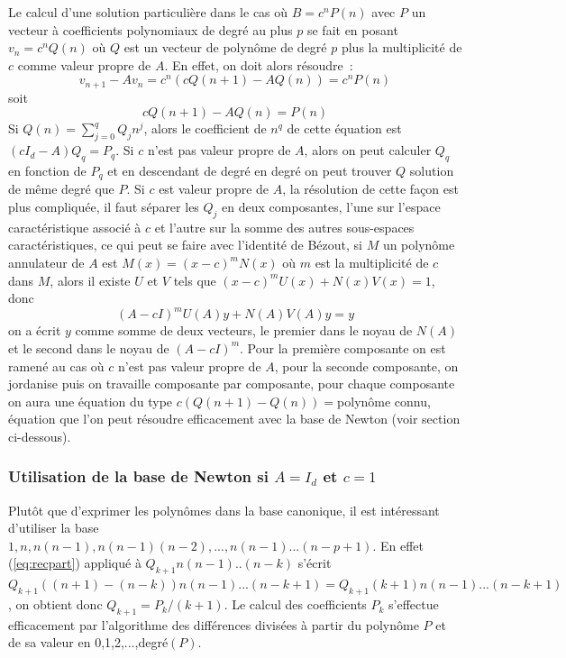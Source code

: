 \documentclass[a4paper,11pt]{article}
\begin{document}
Le calcul d'une solution particulière dans le cas où 
$B=c^n P(n)$ avec $P$ un vecteur à coefficients polynomiaux
de degré au plus $p$ se fait en posant $v_n=c^n Q(n)$
où $Q$ est un vecteur de polynôme de degré $p$ plus la multiplicité
de $c$ comme valeur propre de $A$. En effet, on doit alors résoudre~:
$$v_{n+1}-Av_n = c^n (c Q(n+1)- AQ(n)) = c^n P(n)  $$
soit
\begin{equation} \label{eq:recpart}
c Q(n+1)- AQ(n) = P(n)
\end{equation}
Si $Q(n)=\sum_{j=0}^q Q_j n^j$, alors le coefficient de $n^q$ de cette équation
est $(c I_d -A)Q_q=P_q$. Si $c$ n'est pas valeur propre de $A$, alors
on peut calculer $Q_q$ en fonction de $P_q$ et en descendant de degré en degré
on peut trouver $Q$ solution de même degré que $P$. Si $c$ est valeur
propre de $A$, la résolution de cette façon
est plus compliquée, il faut séparer les
$Q_j$ en deux composantes, l'une sur l'espace caractéristique associé
à $c$ et l'autre sur la somme des autres sous-espaces caractéristiques,
ce qui peut se faire avec l'identité de Bézout, si $M$ un polynôme annulateur
de $A$ est $M(x)=(x-c)^m N(x)$ où $m$ est la multiplicité de $c$ dans $M$,
alors il existe $U$ et $V$ tels que $(x-c)^mU(x)+N(x)V(x)=1$, donc
\[ (A-cI)^m U(A)y+N(A)V(A)y= y\]
on a écrit $y$ comme somme de deux vecteurs, le premier dans le noyau de
$N(A)$ et le second dans le noyau de $(A-cI)^m$. Pour la première
composante on est ramené au cas où $c$ n'est pas valeur propre de $A$,
pour la seconde composante, on jordanise puis on travaille composante
par composante, pour chaque composante on aura une équation du type
$c(Q(n+1)-Q(n))=$polynôme connu, équation 
que l'on peut résoudre efficacement avec
la base de Newton (voir section ci-dessous).

\subsubsection{Utilisation de la base de Newton si $A=I_d$ et $c=1$}
Plutôt que d'exprimer les polynômes dans la base canonique, il est
intéressant d'utiliser la base $1,n,n(n-1),n(n-1)(n-2),...,n(n-1)...(n-p+1)$.
En effet (\ref{eq:recpart}) appliqué à $Q_{k+1} n(n-1)..(n-k)$ s'écrit
$Q_{k+1}((n+1)-(n-k))n(n-1)...(n-k+1)=Q_{k+1}(k+1)n(n-1)...(n-k+1)$, on obtient
donc $Q_{k+1}=P_{k}/(k+1)$. Le calcul des coefficients $P_k$ s'effectue
efficacement par l'algorithme des différences divisées à partir
du polynôme $P$ et de sa valeur en 0,1,2,...,degré$(P)$.
\end{document}
